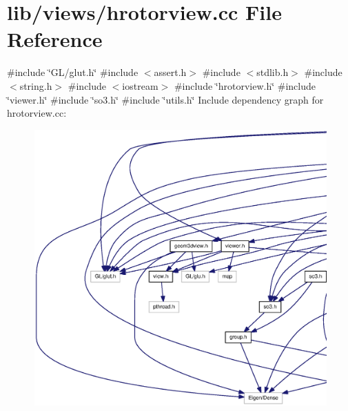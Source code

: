 \section{lib/views/hrotorview.cc \-File \-Reference}
\label{hrotorview_8cc}
{\ttfamily \#include \char`\"{}\-G\-L/glut.\-h\char`\"{}}\*
{\ttfamily \#include $<$assert.\-h$>$}\*
{\ttfamily \#include $<$stdlib.\-h$>$}\*
{\ttfamily \#include $<$string.\-h$>$}\*
{\ttfamily \#include $<$iostream$>$}\*
{\ttfamily \#include \char`\"{}hrotorview.\-h\char`\"{}}\*
{\ttfamily \#include \char`\"{}viewer.\-h\char`\"{}}\*
{\ttfamily \#include \char`\"{}so3.\-h\char`\"{}}\*
{\ttfamily \#include \char`\"{}utils.\-h\char`\"{}}\*
\-Include dependency graph for hrotorview.\-cc\-:\nopagebreak
\begin{figure}[H]
\begin{center}
\leavevmode
\includegraphics[width=350pt]{hrotorview_8cc__incl}
\end{center}
\end{figure}
